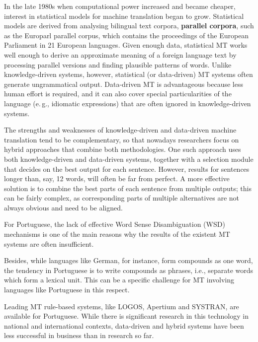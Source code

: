 \begin{multicols}{2}
In the late 1980s when computational power increased and became cheaper, interest in statistical models for machine translation began to grow. Statistical models are derived from analysing bilingual text corpora, \textbf{parallel corpora}, such as the Europarl parallel corpus, which contains the proceedings of the European Parliament in 21 European languages. Given enough data, statistical MT works well enough to derive an approximate meaning of a foreign language text by processing parallel versions and finding plausible patterns of words. Unlike knowledge-driven systems, however, statistical (or data-driven) MT systems often generate ungrammatical output. Data-driven MT is advantageous because less human effort is required, and it can also cover special particularities of the language (e.\,g., idiomatic expressions) that are often ignored in knowledge-driven systems. 

The strengths and weaknesses of knowledge-driven and data-driven machine translation tend to be complementary, so that nowadays researchers focus on hybrid approaches that combine both methodologies. One such approach uses both knowledge-driven and data-driven systems, together with a selection module that decides on the best output for each sentence. However, results for sentences longer than, say, 12 words, will often be far from perfect. A more effective solution is to combine the best parts of each sentence from multiple outputs; this can be fairly complex, as corresponding parts of multiple alternatives are not always obvious and need to be aligned. 


For Portuguese, the lack of effective Word Sense Disambiguation (WSD) mechanisms is one of the main reasons why the results of the existent MT systems are often insufficient. 

Besides, while languages like German, for instance, form compounds as one word, the tendency in Portuguese is to write compounds as phrases, i.e., separate words which form a lexical unit. This can be a specific challenge for MT involving languages like Portuguese in this respect.

Leading MT rule-based systems, like LOGOS, Apertium and SYSTRAN, are available for Portuguese. While there is significant research in this technology in national and international contexts, data-driven and hybrid systems have been less successful in business than in research so far. 


\end{multicols}
